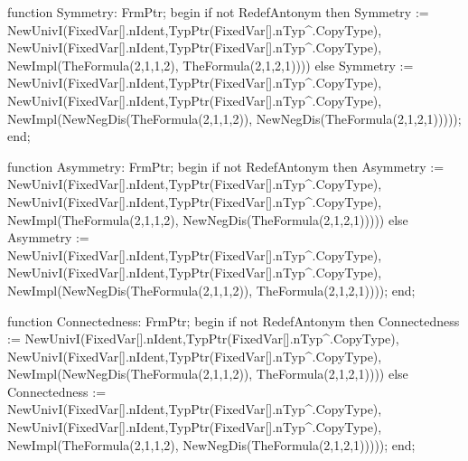    function Symmetry: FrmPtr;
   begin
      if not RedefAntonym then Symmetry := 
         NewUnivI(FixedVar[].nIdent,TypPtr(FixedVar[].nTyp^.CopyType),
                  NewUnivI(FixedVar[].nIdent,TypPtr(FixedVar[].nTyp^.CopyType),
                           NewImpl(TheFormula(2,1,1,2),
                                   TheFormula(2,1,2,1))))
      else Symmetry := 
         NewUnivI(FixedVar[].nIdent,TypPtr(FixedVar[].nTyp^.CopyType),
                  NewUnivI(FixedVar[].nIdent,TypPtr(FixedVar[].nTyp^.CopyType),
                           NewImpl(NewNegDis(TheFormula(2,1,1,2)),
                                   NewNegDis(TheFormula(2,1,2,1)))));
   end;
   
   function Asymmetry: FrmPtr;
   begin
      if not RedefAntonym then Asymmetry := 
         NewUnivI(FixedVar[].nIdent,TypPtr(FixedVar[].nTyp^.CopyType),
                  NewUnivI(FixedVar[].nIdent,TypPtr(FixedVar[].nTyp^.CopyType),
                           NewImpl(TheFormula(2,1,1,2),
                                   NewNegDis(TheFormula(2,1,2,1)))))
      else Asymmetry := 
         NewUnivI(FixedVar[].nIdent,TypPtr(FixedVar[].nTyp^.CopyType),
                  NewUnivI(FixedVar[].nIdent,TypPtr(FixedVar[].nTyp^.CopyType),
                           NewImpl(NewNegDis(TheFormula(2,1,1,2)),
                                   TheFormula(2,1,2,1))));
   end;
   
   function Connectedness: FrmPtr;
   begin
      if not RedefAntonym then Connectedness := 
         NewUnivI(FixedVar[].nIdent,TypPtr(FixedVar[].nTyp^.CopyType),
                  NewUnivI(FixedVar[].nIdent,TypPtr(FixedVar[].nTyp^.CopyType),
                           NewImpl(NewNegDis(TheFormula(2,1,1,2)),
                                   TheFormula(2,1,2,1))))
      else Connectedness := 
         NewUnivI(FixedVar[].nIdent,TypPtr(FixedVar[].nTyp^.CopyType),
                  NewUnivI(FixedVar[].nIdent,TypPtr(FixedVar[].nTyp^.CopyType),
                           NewImpl(TheFormula(2,1,1,2),
                                   NewNegDis(TheFormula(2,1,2,1)))));
   end;
   
